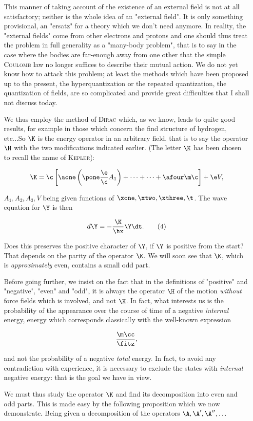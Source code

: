 \documentclass{article}
\newcommand{\nequ}[2]{
\begin{equation*}
#1
\tag{#2}
\end{equation*}
}
\newcommand{\uequ}[1]{
\begin{equation*}
#1
\end{equation*}
}
\newcommand{\var}[1]{#1}
\newcommand{\primed}[1]{{#1^{\prime}}}
\newcommand{\pprimed}[1]{{#1}^{\prime\prime}}
\renewcommand{\it}[1]{\textit{#1}}
\renewcommand{\sc}[1]{\textsc{#1}}
\newcommand{\Ai}[1]{\var{A}_{#1}}
\newcommand{\V}{\var{V}}
\newcommand{\ifitz}[1]{\frac{#1}{\fitz}}
\begin{document}
This manner of taking account of the existence of an external field is not at all satisfactory; neither is the whole idea of an "external field". It is only something provisional, an "ersatz" for a theory which we don't need anymore. In reality, the "external fields" come from other electrons and protons and one should thus treat the problem in full generality as a "many-body problem", that is to say in the case where the bodies are far-enough away from one other that the simple \sc{Coulomb} law no longer suffices to describe their mutual action. We do not yet know how to attack this problem; at least the methods which have been proposed up to the present, the hyperquantization \sic or the repeated quantization, the quantization of fields, are so complicated and provide great difficulties that I shall not discuss today.

We thus employ the method of \sc{Dirac} which, as we know, leads to quite good results, for example in those which concern the find structure of hydrogen, etc...So $\K$ is the energy operator in an arbitrary field, that is to say the operator $\H$ with the two modifications indicated earlier. (The letter $\K$ has been chosen to recall the name of \sc{Kepler}):
\uequ{
    \K = \c\left[
        \aone\left(\pone \frac{\e}{\c}\Ai{1} \right) + \dots + \dots + \afour\m\c
    \right] + \e\V,
}
$\Ai{1}, \Ai{2}, \Ai{3}, \V$ being given functions of $\xone, \xtwo, \xthree, \t$. The wave equation for $\Y$ is then
\nequ{
    d\Y = -\frac{\K}{\hx}\Y\dt.
}{4}

Does this preserves the positive character of $\Y$, if $\Y$ is positive from the start? That depends on the parity of the operator $\K$. We will soon see that $\K$, which is \it{approximately} even, contains a small odd part.

Before going further, we insist on the fact that in the definitions of "positive" and "negative", "even" and "odd", it is always the operator $\H$ of the motion \it{without} force fields which is involved, and not $\K$. In fact, what interests us is the probability of the appearance over the course of time of a negative \it{internal} energy, energy which corresponds classically with the well-known expression

\uequ{
\ifitz{\m\cc},
}
and not the probability of a negative \it{total} energy. In fact, to avoid any contradiction with experience, it is necessary to exclude the states with \it{internal} negative energy: that is the goal we have in view.

We must thus study the operator $\K$ and find its decomposition into even and odd parts. This is made easy by the following proposition which we now demonstrate. Being given a decomposition of the operators $\A, \primed{\A}, \pprimed{\A}, \dots$
\end{document}
